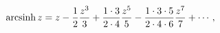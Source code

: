 \[\mathop{\mathrm{arcsinh}\/}\nolimits z=z-\frac{1}{2}\frac{z^{3}}{3}+\frac{1%
\cdot 3}{2\cdot 4}\frac{z^{5}}{5}-\frac{1\cdot 3\cdot 5}{2\cdot 4\cdot 6}\frac%
{z^{7}}{7}+\cdots,\]